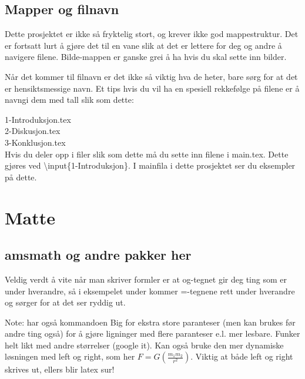     \subsection{Mapper og filnavn}
        Dette prosjektet er ikke så fryktelig stort, og krever ikke god mappestruktur. Det er fortsatt lurt å gjøre det til en vane slik at det er lettere for deg og andre å navigere filene. Bilde-mappen er ganske grei å ha hvis du skal sette inn bilder.
        
        Når det kommer til filnavn er det ikke så viktig hva de heter, bare sørg for at det er hensiktsmessige navn. Et tips hvis du vil ha en spesiell rekkefølge på filene er å navngi dem med tall slik som dette:
        
        1-Introduksjon.tex\\
        2-Diskusjon.tex\\
        3-Konklusjon.tex\\
        
        Hvis du deler opp i filer slik som dette må du sette inn filene i main.tex. Dette gjøres ved \textbackslash input\{1-Introduksjon\}. I mainfila i dette prosjektet ser du eksempler på dette.
        
    
\section{Matte}
    \subsection{amsmath og andre pakker her}


        Veldig verdt å vite når man skriver formler er at og-tegnet gir deg ting som er under hverandre, så i eksempelet under kommer =-tegnene rett under hverandre og sørger for at det ser ryddig ut. 

        Note: har også kommandoen Big for ekstra store paranteser (men kan brukes før andre ting også) for å gjøre ligninger med flere paranteser e.l. mer lesbare. Funker helt likt med andre størrelser (google it). Kan også bruke den mer dynamiske løsningen med left og right, som her \(F = G \left(  \frac{m_1 m_2}{r^2} \right)\). Viktig at både left og right skrives ut, ellers blir latex sur!

